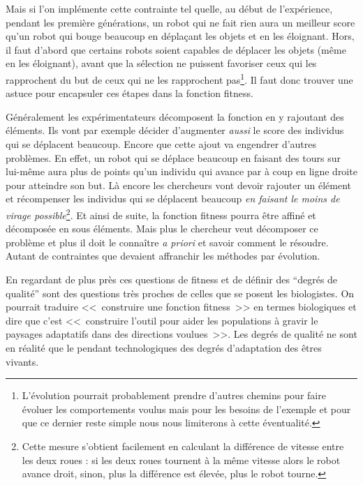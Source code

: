 Mais si l'on implémente cette contrainte tel quelle, au début de l'expérience, pendant les première générations, un robot qui ne fait rien aura un meilleur score qu'un robot qui bouge beaucoup en déplaçant les objets et en les éloignant. Hors, il faut d'abord que certains robots soient capables de déplacer les objets (même en les éloignant), avant que la sélection ne puissent favoriser ceux qui les rapprochent du but de ceux qui ne les rapprochent pas\footnote{L'évolution pourrait probablement prendre d'autres chemins pour faire évoluer les comportements voulus mais pour les besoins de l'exemple et pour que ce dernier reste simple nous nous limiterons à cette éventualité.}. Il faut donc trouver une astuce pour encapsuler ces étapes dans la fonction fitness.

Généralement les expérimentateurs décomposent la fonction en y rajoutant des éléments. Ils vont par exemple décider d'augmenter \emph{aussi} le score des individus qui se déplacent beaucoup. Encore que cette ajout va engendrer d'autres problèmes. En effet, un robot qui se déplace beaucoup en faisant des tours sur lui-même aura plus de points qu'un individu qui avance par à coup en ligne droite pour atteindre son but. Là encore les chercheurs vont devoir rajouter un élément et récompenser les individus qui se déplacent beaucoup \emph{en faisant le moins de virage possible}\footnote{Cette mesure s'obtient facilement en calculant la différence de vitesse entre les deux roues : si les deux roues tournent à la même vitesse alors le robot avance droit, sinon, plus la différence est élevée, plus le robot tourne.}. Et ainsi de suite, la fonction fitness pourra être affiné et décomposée en sous éléments. Mais plus le chercheur veut décomposer ce problème et plus il doit le connaître \emph{a priori} et savoir comment le résoudre. Autant de contraintes que devaient affranchir les méthodes par évolution.

En regardant de plus près ces questions de fitness et de définir des ``degrés de qualité'' sont des questions très proches de celles que se posent les biologistes.
On pourrait traduire <<~construire une fonction fitness~>> en termes biologiques et dire que c'est <<~construire l'outil pour aider les populations à gravir le paysages adaptatifs dans des directions voulues~>>. Les degrés de qualité ne sont en réalité que le pendant technologiques des degrés d'adaptation des êtres vivants.

